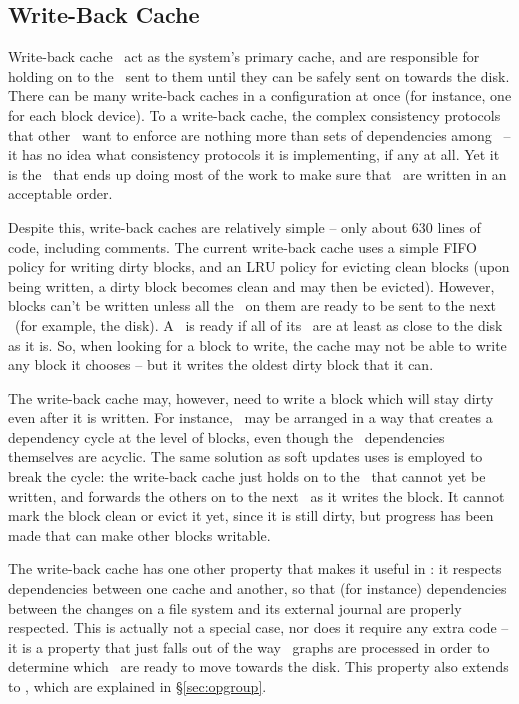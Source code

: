 \subsection{Write-Back Cache}
\label{sec:using:wbcache}

Write-back cache \modules\ act as the system's primary cache, and are responsible
for holding on to the \chdescs\ sent to them until they can be safely sent on
towards the disk. There can be many write-back caches in a configuration at once
(for instance, one for each block device). To a write-back cache, the complex
consistency protocols that other \modules\ want to enforce are nothing more than
sets of dependencies among \chdescs\ -- it has no idea what consistency
protocols it is implementing, if any at all. Yet it is the \module\ that ends up
doing most of the work to make sure that \chdescs\ are written in an acceptable
order.

Despite this, write-back caches are relatively simple -- only about 630 lines of
code, including comments. The current write-back cache uses a simple FIFO policy
for writing dirty blocks, and an LRU policy for evicting clean blocks (upon
being written, a dirty block becomes clean and may then be evicted). However,
blocks can't be written unless all the \chdescs\ on them are ready to be sent to
the next \module\ (for example, the disk). A \chdesc\ is ready if all of its
\befores\ are at least as close to the disk as it is. So, when looking for a
block to write, the cache may not be able to write any block it chooses -- but
it writes the oldest dirty block that it can.

The write-back cache may, however, need to write a block which will stay dirty
even after it is written. For instance, \chdescs\ may be arranged in a way that
creates a dependency cycle at the level of blocks, even though the \chdesc\
dependencies themselves are acyclic. The same solution as soft updates uses is
employed to break the cycle: the write-back cache just holds on to the \chdescs\
that cannot yet be written, and forwards the others on to the next \module\ as
it writes the block. It cannot mark the block clean or evict it yet, since it is
still dirty, but progress has been made that can make other blocks writable.

The write-back cache has one other property that makes it useful in \Kudos: it
respects dependencies between one cache and another, so that (for instance)
dependencies between the changes on a file system and its external journal are
properly respected. This is actually not a special case, nor does it require any
extra code -- it is a property that just falls out of the way \chdesc\ graphs
are processed in order to determine which \chdescs\ are ready to move towards
the disk. This property also extends to \opgroups, which
are explained in \S\ref{sec:opgroup}.
